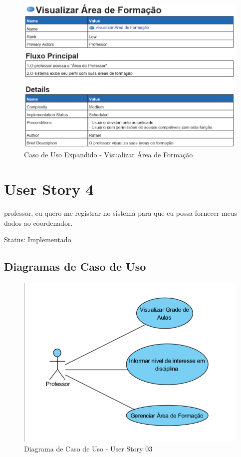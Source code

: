 \documentclass{abnt}
\begin{document}
\begin{figure}[h]
			\begin{center}
				 \includegraphics[width=450px]{casoUsoVisualizarAreaFormacao}
				 \caption{Caso de Uso Expandido - Visualizar Área de Formação}
			\end{center}
		\end{figure}
		
			
	\clearpage
		\section{User Story 4}
	
			\begin{itemize}
				\itemComo professor, eu quero me registrar no sistema para que eu possa fornecer meus dados ao coordenador.
			\end{itemize}
			
			Status: Implementado
			
			\subsection{Diagramas de Caso de Uso}
			\begin{figure}[h]
				\begin{center}
				 \includegraphics[width=450px]{CasoUsoUserStory3}
				 \caption{Diagrama de Caso de Uso - User Story 03}
				 \label{fig:CasoUsoUserStory3}
				\end{center}
			\end{figure}
			
\end{document}
